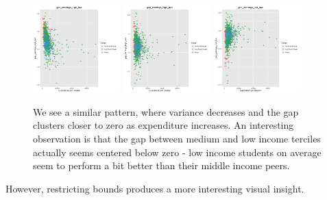 \documentclass{article}
\begin{document}
\begin{figure}[H]
\centering
\includegraphics[width=0.3\textwidth]{../images/eda_scatterplots/gap_earnings_high_low.png}
\includegraphics[width=0.3\textwidth]{../images/eda_scatterplots/gap_earnings_high_mid.png}
\includegraphics[width=0.3\textwidth]{../images/eda_scatterplots/gap_earnings_mid_low.png}
\caption{\label{fig:Completion Rates} We see a similar pattern, where variance decreases and the gap clusters closer to zero as expenditure increases. An interesting observation is that the gap between medium and low income terciles actually seems centered below zero - low income students on average seem to perform a bit better than their middle income peers.}
\end{figure}

However, restricting bounds produces a more interesting visual insight.
\end{document}
